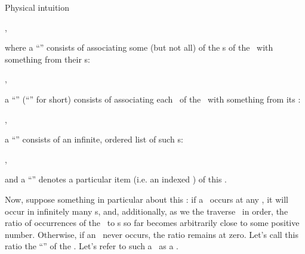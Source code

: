 \begin{part} {Physical intuition}
\begin{center}
,
  \end{center}
  where a ``\masn'' consists of associating some (but not all) of the \var{}s of the \spt\ 
  with something from their \dmn{}s:
  \begin{center}
    ,
  \end{center}
  a ``\jasn'' (``\asn'' for short) consists of associating each \var\ of the \spt\ with something from its \dmn:
  \def\tjasn#1#2#3#4#5{
    \tvar{#1}{#5}   {\AV}{#3}
    \tvar{#2}{($#5 + (0,-1.6)$)}{\BV}{#4}
  }
  \begin{center}
    ,
  \end{center}
  a ``\seq'' consists of an infinite, ordered list of such \jasn{}s:
  \begin{center}
    ,
  \end{center}
  and a ``\trl'' denotes a particular item (i.e. an indexed \jasn) of this \seq.

  Now, suppose something in particular about this \seq:
  if a \jasn\ occurs at any \trl, it will occur in infinitely many \trl{}s,
  and, additionally, as we the traverse \seq\ in order, the ratio of occurrences of the
  \jasn\ to \trl{}s so far becomes arbitrarily close to 
  some positive number. 
  Otherwise, if an \jasn\ never occurs, the ratio remains at zero.
  Let's call this ratio the ``\sprb'' of the \jasn.
  Let's refer to such a \seq\ as a \pseq.


\end{part}
